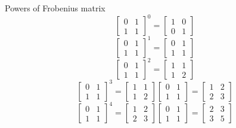 \documentclass{beamer}
\begin{document}
\begin{frame}{Powers of Frobenius matrix}
\pause
$$\left[\begin{array}{cc}
0 & 1\\
1 & 1
\end{array}\right]^0 = \left[\begin{array}{cc}
1 & 0\\
0 & 1
\end{array}\right]$$
\pause
$$\left[\begin{array}{cc}
0 & 1\\
1 & 1
\end{array}\right]^1 = \left[\begin{array}{cc}
0 & 1\\
1 & 1
\end{array}\right]$$
\pause
$$\left[\begin{array}{cc}
0 & 1\\
1 & 1
\end{array}\right]^2 = \left[\begin{array}{cc}
1 & 1\\
1 & 2
\end{array}\right]$$
\pause
$$\left[\begin{array}{cc}
0 & 1\\
1 & 1
\end{array}\right]^3 = \left[\begin{array}{cc}
1 & 1\\
1 & 2
\end{array}\right]
\left[\begin{array}{cc}
0 & 1\\
1 & 1
\end{array}\right] = \left[\begin{array}{cc}
1 & 2\\
2 & 3
\end{array}\right]
$$
\pause
$$\left[\begin{array}{cc}
0 & 1\\
1 & 1
\end{array}\right]^4 = \left[\begin{array}{cc}
1 & 2\\
2 & 3
\end{array}\right]
\left[\begin{array}{cc}
0 & 1\\
1 & 1
\end{array}\right] = \left[\begin{array}{cc}
2 & 3\\
3 & 5
\end{array}\right]
$$
\end{frame}
\end{document}
